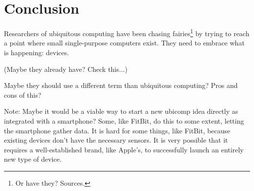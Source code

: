 \section{Conclusion}

Researchers of ubiquitous computing have been chasing fairies\footnote{Or have they? Sources.} by trying to reach
a point where small single-purpose computers exist. They need to embrace what is happening: devices.

(Maybe they already have? Check this...)

Maybe they should use a different term than ubiquitous computing? Pros and cons of this?

Note: Maybe it would be a viable way to start a new ubicomp idea directly as integrated with a smartphone? Some, like FitBit,
do this to some extent, letting the smartphone gather data. It is hard for some things, like FitBit, because existing devices
don't have the necessary sensors. It is very possible that it requires a well-established brand, like Apple's, to successfully
launch an entirely new type of device.